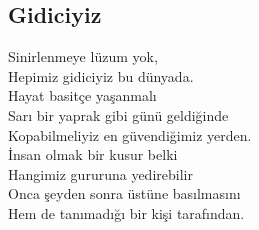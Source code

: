 \subsection{Gidiciyiz}

Sinirlenmeye lüzum yok, \\
Hepimiz gidiciyiz bu dünyada. \\
Hayat basitçe yaşanmalı \\
Sarı bir yaprak gibi günü geldiğinde \\
Kopabilmeliyiz en güvendiğimiz yerden. \\
İnsan olmak bir kusur belki \\
Hangimiz gururuna yedirebilir \\
Onca şeyden sonra üstüne basılmasını \\
Hem de tanımadığı bir kişi tarafından. \\